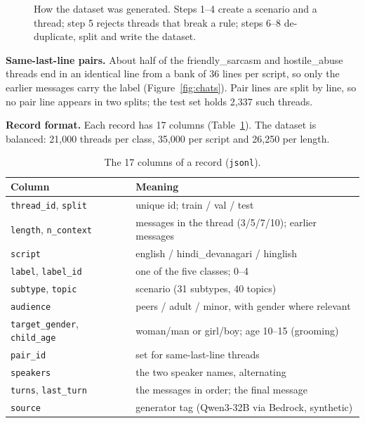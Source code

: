 \documentclass[sigconf,9pt]{acmart}
\begin{document}
\begin{figure}[!t]
  \centering
  \resizebox{\textwidth}{!}{}
  \caption{How the dataset was generated. Steps 1--4 create a scenario and a thread; step 5 rejects threads that break a rule; steps 6--8 de-duplicate, split and write the dataset.}
  \label{fig:datagen}
\end{figure}

\par\textbf{Same-last-line pairs.} About half of the friendly\_sarcasm and hostile\_abuse threads end in an identical line from a bank of 36 lines per script, so only the earlier messages carry the label (Figure~\ref{fig:chats}). Pair lines are split by line, so no pair line appears in two splits; the test set holds 2{,}337 such threads.

\par\textbf{Record format.} Each record has 17 columns (Table~\ref{tab:schema}). The dataset is balanced: 21{,}000 threads per class, 35{,}000 per script and 26{,}250 per length.

\begin{table}[h!]
\centering
\caption{The 17 columns of a record (\texttt{jsonl}).}
\label{tab:schema}
\footnotesize
\begin{tabularx}{\linewidth}{@{}l X@{}}
\toprule
\textbf{Column} & \textbf{Meaning} \\
\midrule
\texttt{thread\_id}, \texttt{split} & unique id; train / val / test \\
\texttt{length}, \texttt{n\_context} & messages in the thread (3/5/7/10); earlier messages \\
\texttt{script} & english / hindi\_devanagari / hinglish \\
\texttt{label}, \texttt{label\_id} & one of the five classes; 0--4 \\
\texttt{subtype}, \texttt{topic} & scenario (31 subtypes, 40 topics) \\
\texttt{audience} & peers / adult / minor, with gender where relevant \\
\texttt{target\_gender}, \texttt{child\_age} & woman/man or girl/boy; age 10--15 (grooming) \\
\texttt{pair\_id} & set for same-last-line threads \\
\texttt{speakers} & the two speaker names, alternating \\
\texttt{turns}, \texttt{last\_turn} & the messages in order; the final message \\
\texttt{source} & generator tag (Qwen3-32B via Bedrock, synthetic) \\
\bottomrule
\end{tabularx}
\end{table}
\end{document}
